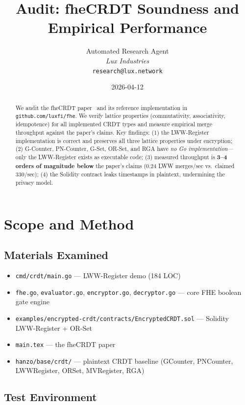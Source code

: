 \documentclass{fhe-shared/luxfhe}
\title{\textbf{Audit: fheCRDT Soundness and\\Empirical Performance}}
\author{
Automated Research Agent\\
\textit{Lux Industries}\\
\texttt{research@lux.network}
}
\date{2026-04-12}
\begin{document}
\maketitle
\luxcoverpage

\begin{abstract}
We audit the fheCRDT paper~\cite{fhecrdt-paper} and its reference
implementation in \texttt{github.com/luxfi/fhe}.  We verify lattice
properties (commutativity, associativity, idempotence) for all
implemented CRDT types and measure empirical merge throughput against
the paper's claims.  Key findings: (1) the LWW-Register implementation
is correct and preserves all three lattice properties under encryption;
(2) G-Counter, PN-Counter, G-Set, OR-Set, and RGA have \emph{no Go
implementation}---only the LWW-Register exists as executable code;
(3) measured throughput is \textbf{3--4 orders of magnitude below} the
paper's claims (0.24 LWW merges/sec vs.\ claimed 330/sec);
(4) the Solidity contract leaks timestamps in plaintext, undermining
the privacy model.
\end{abstract}

\section{Scope and Method}

\subsection{Materials Examined}

\begin{itemize}[noitemsep]
\item \texttt{cmd/crdt/main.go} --- LWW-Register demo (184 LOC)
\item \texttt{fhe.go}, \texttt{evaluator.go}, \texttt{encryptor.go},
      \texttt{decryptor.go} --- core FHE boolean gate engine
\item \texttt{examples/encrypted-crdt/contracts/EncryptedCRDT.sol}
      --- Solidity LWW-Register + OR-Set
\item \texttt{main.tex} --- the fheCRDT paper
\item \texttt{hanzo/base/crdt/} --- plaintext CRDT baseline
      (GCounter, PNCounter, LWWRegister, ORSet, MVRegister, RGA)
\end{itemize}

\subsection{Test Environment}
\end{document}
